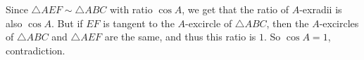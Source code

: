 Since $\triangle{AEF}\sim\triangle{ABC}$ with ratio $\cos A$, we get that the ratio of $A$-exradii is also $\cos A$. But if $EF$ is tangent to the $A$-excircle of $\triangle{ABC}$, then the $A$-excircles of $\triangle{ABC}$ and $\triangle{AEF}$ are the same, and thus this ratio is $1$. So $\cos A=1$, contradiction.